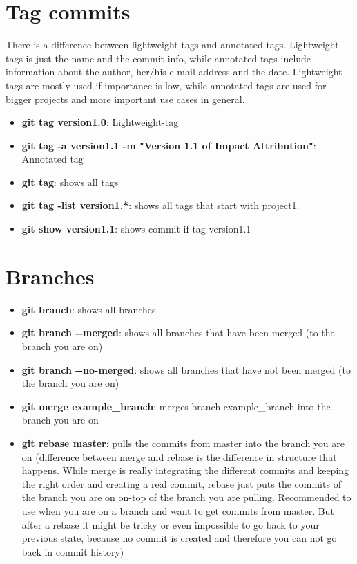 \documentclass[12pt]{article}
\begin{document}
\section{Tag commits}
There is a difference between lightweight-tags and annotated tags. Lightweight-tags is just the name and the commit info, while annotated tags include information about the author, her/his e-mail address and the date. Lightweight-tags are mostly used if importance is low, while annotated tags are used for bigger projects and more important use cases in general.
\begin {itemize}
\item \textbf{git tag version1.0}: Lightweight-tag
\item \textbf{git tag -a version1.1 -m "Version 1.1 of Impact Attribution"}: Annotated tag
\item \textbf{git tag}: shows all tags
\item \textbf{git tag -list version1.*}: shows all tags that start with project1.
\item \textbf{git show version1.1}: shows commit if tag version1.1
\end{itemize}

\section{Branches}
\begin {itemize}
\item \textbf{git branch}: shows all branches
\item \textbf{git branch \textrm{-}\textrm{-}merged}: shows all branches that have been merged (to the branch you are on)
\item \textbf{git branch \textrm{-}\textrm{-}no-merged}: shows all branches that have not been merged (to the branch you are on)
\item \textbf{git merge example\_branch}: merges branch example\_branch into the branch you are on 
\item \textbf{git rebase master}: pulls the commits from master into the branch you are on (difference between merge and rebase is the difference in structure that happens. While merge is really integrating the different commits and keeping the right order and creating a real commit, rebase just puts the commits of the branch you are on on-top of the branch you are pulling. Recommended to use when you are on a branch and want to get commits from master. But after a rebase it might be tricky or even impossible to go back to your previous state, because no commit is created and therefore you can not go back in commit history) 
\end{itemize}
\end{document}
